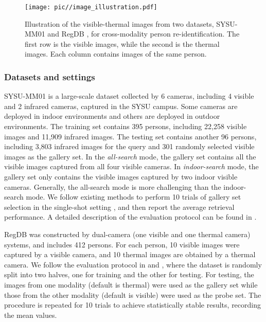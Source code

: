 \documentclass[journal]{IEEEtran}
\begin{document}
\begin{figure}
\centering
\texttt{[image: pic//image\_illustration.pdf]}
\caption{Illustration of the visible-thermal images from two datasets, SYSU-MM01 \cite{wu2017rgb} and RegDB \cite{nguyen2017person}, for cross-modality person re-identification. The first row is the visible images, while the second is the thermal images. Each column contains images of the same person. }
\label{fig:image_illus}
\end{figure}

\subsubsection{Datasets and settings}
SYSU-MM01 \cite{wu2017rgb} is a large-scale dataset collected by 6 cameras, including 4 visible and 2 infrared cameras, captured in the SYSU campus. Some cameras are deployed in indoor environments and others are deployed in outdoor environments.  The training set contains 395 persons, including 22,258 visible images and 11,909 infrared images. The testing set contains another 96 persons, including 3,803 infrared images for the query and 301 randomly selected visible images as the gallery set.
In the \emph{all-search} mode, the gallery set contains all the visible images captured from all four visible cameras. In \emph{indoor-search} mode, the gallery set only contains the visible images captured by two indoor visible cameras. Generally, the all-search mode is more challenging than the indoor-search mode. We follow existing methods to perform 10 trials of gallery set selection in the single-shot setting \cite{ye2018visible,tifs19vtreid}, and then report the average retrieval performance. A detailed description of the evaluation protocol can be found in \cite{wu2017rgb}.

RegDB \cite{nguyen2017person} was constructed by dual-camera (one visible and one thermal camera) systems, and includes 412 persons. For each person, 10 visible images were captured by a visible camera, and 10 thermal images are obtained by a thermal camera. We follow the evaluation protocol in \cite{ye2018hierarchical} and \cite{ye2018visible}, where the dataset is randomly split into two halves, one for training and the other for testing. For testing, the images from one modality (default is thermal) were used as the gallery set while those from the other modality (default is visible) were used as the probe set. The procedure is repeated for 10 trials to achieve statistically stable results, recording the mean values.
\end{document}
